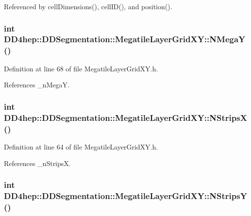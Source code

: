 Referenced by cellDimensions(), cellID(), and position().\hypertarget{class_d_d4hep_1_1_d_d_segmentation_1_1_megatile_layer_grid_x_y_ac5c3cbce77f0b432cc597689fab38c59}{
\subsubsection[{NMegaY}]{\setlength{\rightskip}{0pt plus 5cm}int DD4hep::DDSegmentation::MegatileLayerGridXY::NMegaY ()}}
\label{class_d_d4hep_1_1_d_d_segmentation_1_1_megatile_layer_grid_x_y_ac5c3cbce77f0b432cc597689fab38c59}


Definition at line 68 of file MegatileLayerGridXY.h.

References \_\-nMegaY.\hypertarget{class_d_d4hep_1_1_d_d_segmentation_1_1_megatile_layer_grid_x_y_a6004cfbffa52b347d04d12a0bd0657c0}{
\subsubsection[{NStripsX}]{\setlength{\rightskip}{0pt plus 5cm}int DD4hep::DDSegmentation::MegatileLayerGridXY::NStripsX ()}}
\label{class_d_d4hep_1_1_d_d_segmentation_1_1_megatile_layer_grid_x_y_a6004cfbffa52b347d04d12a0bd0657c0}


Definition at line 64 of file MegatileLayerGridXY.h.

References \_\-nStripsX.\hypertarget{class_d_d4hep_1_1_d_d_segmentation_1_1_megatile_layer_grid_x_y_a66306093675275c371f813c48fb39d70}{
\subsubsection[{NStripsY}]{\setlength{\rightskip}{0pt plus 5cm}int DD4hep::DDSegmentation::MegatileLayerGridXY::NStripsY ()}}
\label{class_d_d4hep_1_1_d_d_segmentation_1_1_megatile_layer_grid_x_y_a66306093675275c371f813c48fb39d70}


